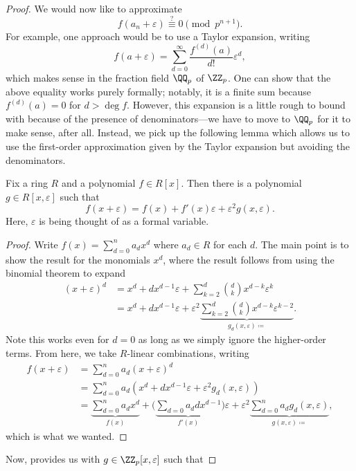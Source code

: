 \documentclass[../notes.tex]{subfiles}
\begin{document}
\begin{proof}
	We would now like to approximate
	\[f(a_n+\varepsilon)\stackrel?\equiv0\pmod{p^{n+1}}.\]
	For example, one approach would be to use a Taylor expansion, writing
	\[f(a+\varepsilon)=\sum_{d=0}^\infty\frac{f^{(d)}(a)}{d!}\varepsilon^d,\]
	which makes sense in the fraction field $\QQ_p$ of $\ZZ_p$. One can show that the above equality works purely formally; notably, it is a finite sum because $f^{(d)}(a)=0$ for $d>\deg f$. However, this expansion is a little rough to bound with because of the presence of denominators---we have to move to $\QQ_p$ for it to make sense, after all. Instead, we pick up the following lemma which allows us to use the first-order approximation given by the Taylor expansion but avoiding the denominators.
	\begin{lemma} \label{lem:first-order-taylor}
		Fix a ring $R$ and a polynomial $f\in R[x]$. Then there is a polynomial $g\in R[x,\varepsilon]$ such that
		\[f(x+\varepsilon)=f(x)+f'(x)\varepsilon+\varepsilon^2g(x,\varepsilon).\]
		Here, $\varepsilon$ is being thought of as a formal variable.
	\end{lemma}
	\begin{proof}
		Write $f(x)=\sum_{d=0}^na_dx^d$ where $a_d\in R$ for each $d$. The main point is to show the result for the monomials $x^d$, where the result follows from using the binomial theorem to expand
		\begin{align*}
			(x+\varepsilon)^d &= x^d+dx^{d-1}\varepsilon+\sum_{k=2}^d\binom dkx^{d-k}\varepsilon^k \\
			&= x^d+dx^{d-1}\varepsilon+\varepsilon^2\underbrace{\sum_{k=2}^d\binom dkx^{d-k}\varepsilon^{k-2}}_{g_d(x,\varepsilon)\coloneqq}.
		\end{align*}
		Note this works even for $d=0$ as long as we simply ignore the higher-order terms. From here, we take $R$-linear combinations, writing
		\begin{align*}
			f(x+\varepsilon) &= \sum_{d=0}^na_d(x+\varepsilon)^d \\
			&= \sum_{d=0}^na_d\left(x^d+dx^{d-1}\varepsilon+\varepsilon^2g_d(x,\varepsilon)\right) \\
			&= \underbrace{\sum_{d=0}^na_dx^d}_{f(x)}+\Bigg(\underbrace{\sum_{d=0}a_ddx^{d-1}}_{f'(x)}\Bigg)\varepsilon+\varepsilon^2\underbrace{\sum_{d=0}^na_dg_d(x,\varepsilon)}_{g(x,\varepsilon)\coloneqq},
		\end{align*}
		which is what we wanted.
	\end{proof}
	Now,  provides us with $g\in\ZZ_p[x,\varepsilon]$ such that

\end{proof}
\end{document}
